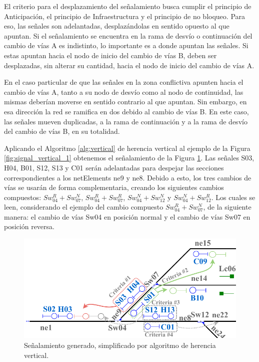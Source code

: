     El criterio para el desplazamiento del señalamiento busca cumplir el principio de Anticipación, el principio de Infraestructura y el principio de no bloqueo. Para eso, las señales son adelantadas, desplazándolas en sentido opuesto al que apuntan. Si el señalamiento se encuentra en la rama de desvío o continuación del cambio de vías A es indistinto, lo importante es a donde apuntan las señales. Si estas apuntan hacia el nodo de inicio del cambio de vías B, deben ser desplazadas, sin alterar su cantidad, hacia el nodo de inicio del cambio de vías A. 
    
    En el caso particular de que las señales en la zona conflictiva apunten hacia el cambio de vías A, tanto a su nodo de desvío como al nodo de continuidad, las mismas deberían moverse en sentido contrario al que apuntan. Sin embargo, en esa dirección la red se ramifica en dos debido al cambio de vías B. En este caso, las señales mueven duplicadas, a la rama de continuación y a la rama de desvío del cambio de vías B, en su totalidad.
    
    Aplicando el Algoritmo \ref{alg:vertical} de herencia vertical al ejemplo de la Figura \ref{fig:signal_vertical_1} obtenemos el señalamiento de la Figura \ref{fig:signal_vertical_2}. Las señales S03, H04, B01, S12, S13 y C01 serán adelantadas para despejar las secciones correspondientes a los netElements ne9 y ne8. Debido a esto, los tres cambios de vías se usarán de forma complementaria, creando los siguientes cambios compuestos: $Sw_{04}^R+Sw_{07}^N$, $Sw_{04}^R+Sw_{07}^R$, $Sw_{04}^N+Sw_{12}^N$ y $Sw_{04}^N+Sw_{12}^R$. Los cuales se leen, considerando el ejemplo del cambio compuesto $Sw_{04}^R+Sw_{07}^N$, de la siguiente manera: el cambio de vías Sw04 en posición normal y el cambio de vías Sw07 en posición reversa.
    
    \begin{figure}[H]
    	\centering
    	\includegraphics[width=1\textwidth]{Figuras/Figure9_Crop.pdf}
    	\centering\caption{Señalamiento generado, simplificado por algoritmo de herencia vertical.}
    	\label{fig:signal_vertical_2}
    \end{figure}
    
